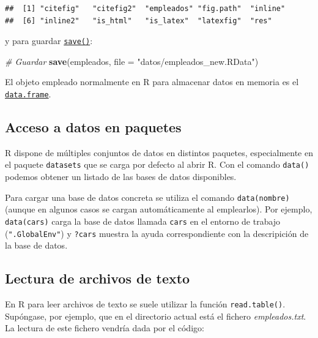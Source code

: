 \documentclass[]{book}
\newenvironment{Shaded}{\begin{snugshade}}{\end{snugshade}}
\newcommand{\CommentTok}[1]{\textcolor[rgb]{0.56,0.35,0.01}{\textit{#1}}}
\newcommand{\DataTypeTok}[1]{\textcolor[rgb]{0.13,0.29,0.53}{#1}}
\newcommand{\KeywordTok}[1]{\textcolor[rgb]{0.13,0.29,0.53}{\textbf{#1}}}
\newcommand{\NormalTok}[1]{#1}
\newcommand{\StringTok}[1]{\textcolor[rgb]{0.31,0.60,0.02}{#1}}
\begin{document}
\begin{verbatim}
##  [1] "citefig"   "citefig2"  "empleados" "fig.path"  "inline"   
##  [6] "inline2"   "is_html"   "is_latex"  "latexfig"  "res"
\end{verbatim}

y para guardar \href{https://www.rdocumentation.org/packages/base/versions/3.6.1/topics/save}{\texttt{save()}}:

\begin{Shaded}
\begin{Highlighting}[]
\CommentTok{# Guardar}
\KeywordTok{save}\NormalTok{(empleados, }\DataTypeTok{file =} \StringTok{"datos/empleados_new.RData"}\NormalTok{)}
\end{Highlighting}
\end{Shaded}

El objeto empleado normalmente en R para almacenar datos en memoria
es el \href{https://www.rdocumentation.org/packages/base/versions/3.6.1/topics/data.frame}{\texttt{data.frame}}.

\hypertarget{acceso-a-datos-en-paquetes}{%
\subsection{Acceso a datos en paquetes}\label{acceso-a-datos-en-paquetes}}

R dispone de múltiples conjuntos de datos en distintos paquetes, especialmente en el paquete \texttt{datasets}
que se carga por defecto al abrir R.
Con el comando \texttt{data()} podemos obtener un listado de las bases de datos disponibles.

Para cargar una base de datos concreta se utiliza el comando
\texttt{data(nombre)} (aunque en algunos casos se cargan automáticamente al emplearlos).
Por ejemplo, \texttt{data(cars)} carga la base de datos llamada \texttt{cars} en el entorno de trabajo (\texttt{".GlobalEnv"})
y \texttt{?cars} muestra la ayuda correspondiente con la descripición de la base de datos.

\hypertarget{cap4-texto}{%
\subsection{Lectura de archivos de texto}\label{cap4-texto}}

En R para leer archivos de texto se suele utilizar la función \texttt{read.table()}.
Supóngase, por ejemplo, que en el directorio actual está el fichero
\emph{empleados.txt}. La lectura de este fichero vendría dada por el código:
\end{document}
